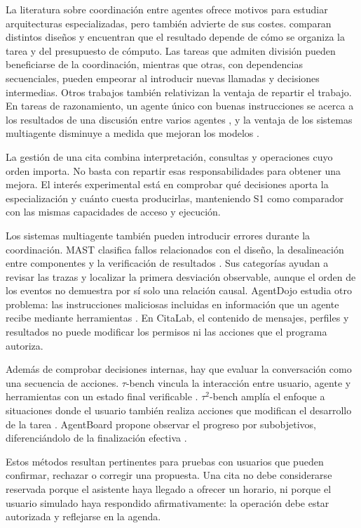 La literatura sobre coordinación entre agentes ofrece motivos para estudiar arquitecturas especializadas, pero también advierte de sus costes. \citet{kim2026scalingagents} comparan distintos diseños y encuentran que el resultado depende de cómo se organiza la tarea y del presupuesto de cómputo. Las tareas que admiten división pueden beneficiarse de la coordinación, mientras que otras, con dependencias secuenciales, pueden empeorar al introducir nuevas llamadas y decisiones intermedias. Otros trabajos también relativizan la ventaja de repartir el trabajo. En tareas de razonamiento, un agente único con buenas instrucciones se acerca a los resultados de una discusión entre varios agentes \citep{wang2024multiagentdiscussion}, y la ventaja de los sistemas multiagente disminuye a medida que mejoran los modelos \citep{gao2025singlemulti}.

La gestión de una cita combina interpretación, consultas y operaciones cuyo orden importa. No basta con repartir esas responsabilidades para obtener una mejora. El interés experimental está en comprobar qué decisiones aporta la especialización y cuánto cuesta producirlas, manteniendo S1 como comparador con las mismas capacidades de acceso y ejecución.

Los sistemas multiagente también pueden introducir errores durante la coordinación. MAST clasifica fallos relacionados con el diseño, la desalineación entre componentes y la verificación de resultados \citep{cemri2025mast}. Sus categorías ayudan a revisar las trazas y localizar la primera desviación observable, aunque el orden de los eventos no demuestra por sí solo una relación causal. AgentDojo estudia otro problema: las instrucciones maliciosas incluidas en información que un agente recibe mediante herramientas \citep{debenedetti2024agentdojo}. En CitaLab, el contenido de mensajes, perfiles y resultados no puede modificar los permisos ni las acciones que el programa autoriza.

Además de comprobar decisiones internas, hay que evaluar la conversación como una secuencia de acciones. $\tau$-bench vincula la interacción entre usuario, agente y herramientas con un estado final verificable \citep{yao2024taubench}. $\tau^2$-bench amplía el enfoque a situaciones donde el usuario también realiza acciones que modifican el desarrollo de la tarea \citep{barres2025tau2}. AgentBoard propone observar el progreso por subobjetivos, diferenciándolo de la finalización efectiva \citep{ma2024agentboard}.

Estos métodos resultan pertinentes para pruebas con usuarios que pueden confirmar, rechazar o corregir una propuesta. Una cita no debe considerarse reservada porque el asistente haya llegado a ofrecer un horario, ni porque el usuario simulado haya respondido afirmativamente: la operación debe estar autorizada y reflejarse en la agenda.

